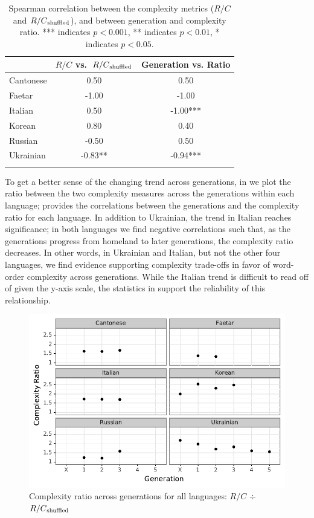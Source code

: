 \documentclass[output=paper]{langscibook}
\begin{document}
\begin{table}
\begin{tabular}{l S[table-format=-1.2{**}] S[table-format=-1.2{***}]}
\lsptoprule
& {$R/C$ vs.~$R/C\textsubscript{shuffled}$} & {Generation vs.  Ratio} \\
\midrule
Cantonese  & 0.50      & 0.50  \\
Faetar     & -1.00     & -1.00 \\
Italian    & 0.50      & -1.00{***}\\
Korean     & 0.80      & 0.40 \\
Russian    & -0.50     & 0.50  \\
Ukrainian  & -0.83{**} & -0.94{***}\\
\lspbottomrule
\end{tabular}
\caption{Spearman correlation between the complexity metrics ($R/C$ and $R/C\textsubscript{shuffled}$), and between generation and complexity ratio. *** indicates $p < 0.001$,  ** indicates $p < 0.01$, * indicates $p< 0.05$.}
  \label{fig:corr}
\end{table}

To get a better sense of the changing trend across generations, in  we plot the ratio between the two complexity measures across the generations within each language;  provides the correlations between the generations and the complexity ratio for each language. In addition to Ukrainian, the trend in Italian reaches significance; in both languages we find negative correlations such that, as the generations progress from homeland to later generations, the complexity ratio decreases. In other words, in Ukrainian and Italian, but not the other four languages, we find evidence supporting complexity trade-offs in favor of word-order complexity across generations. While the Italian trend is difficult to read off of  given the y-axis scale, the statistics in  support the reliability of this relationship.

\begin{figure}[t]
\centerline{\includegraphics[width=\linewidth]{figures/All_ggplot_complexity.pdf}}
\caption{Complexity ratio across generations for all languages: $R/C$ $\div$   $R/C\textsubscript{shuffled}$}
\label{fig:other-languages-ratio}
\end{figure}
\end{document}
